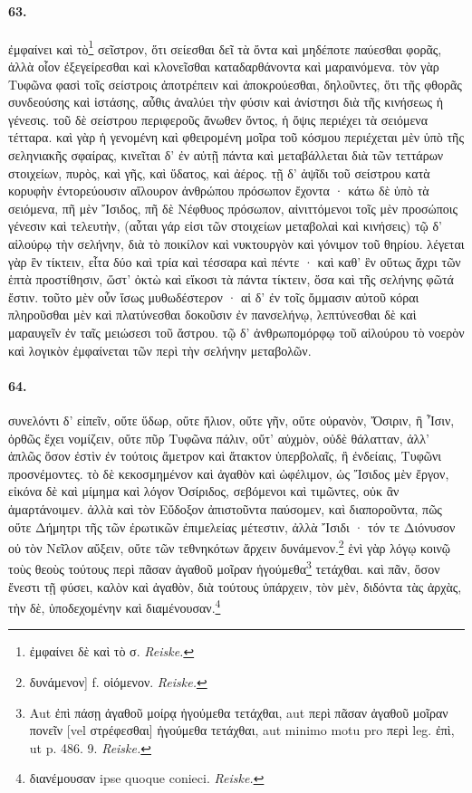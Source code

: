 \documentclass[a4paper, 11pt, oneside, polutonikogreek, german, landscape]{article}
\begin{document}
\paragraph{63.}
ἐμφαίνει καὶ τὸ\footnote{ἐμφαίνει δὲ καὶ τὸ σ. \emph{Reiske.}} σεῖστρον, ὅτι σείεσθαι δεῖ τὰ ὄντα καὶ μηδέποτε παύεσθαι φορᾶς, ἀλλὰ οἷον ἐξεγείρεσθαι καὶ κλονεῖσθαι καταδαρθάνοντα καὶ μαραινόμενα. τὸν γὰρ Τυφῶνα φασὶ τοῖς σείστροις ἀποτρέπειν καὶ ἀποκρούεσθαι, δηλοῦντες, ὅτι τῆς φθορᾶς συνδεούσης καὶ ἱστάσης, αὖθις ἀναλύει τὴν φύσιν καὶ ἀνίστησι διὰ τῆς κινήσεως ἡ γένεσις. τοῦ δὲ σείστρου περιφεροῦς ἄνωθεν ὄντος, ἡ ὄψις περιέχει τὰ σειόμενα τέτταρα. καὶ γὰρ ἡ γενομένη καὶ φθειρομένη μοῖρα τοῦ κόσμου περιέχεται μὲν ὑπὸ τῆς σεληνιακῆς σφαίρας, κινεῖται δ' ἐν αὐτῇ πάντα καὶ μεταβάλλεται διὰ τῶν τεττάρων στοιχείων, πυρὸς, καὶ γῆς, καὶ ὕδατος, καὶ ἀέρος. τῇ δ' ἀψῖδι τοῦ σείστρου κατὰ κορυφὴν ἐντορεύουσιν αἴλουρον ἀνθρώπου πρόσωπον ἔχοντα · κάτω δὲ ὑπὸ τὰ σειόμενα, πῆ μὲν Ἴσιδος, πῆ δὲ Νέφθυος πρόσωπον, αἰνιττόμενοι τοῖς μὲν προσώποις γένεσιν καὶ τελευτὴν, (αὗται γάρ εἰσι τῶν στοιχείων μεταβολαὶ καὶ κινήσεις) τῷ δ' αἰλούρῳ τὴν σελήνην, διὰ τὸ ποικίλον καὶ νυκτουργὸν καὶ γόνιμον τοῦ θηρίου. λέγεται γὰρ ἓν τίκτειν, εἶτα δύο καὶ τρία καὶ τέσσαρα καὶ πέντε · καὶ καθ' ἓν οὕτως ἄχρι τῶν ἑπτὰ προστίθησιν, ὥστ' ὀκτὼ καὶ εἴκοσι τὰ πάντα τίκτειν, ὅσα καὶ τῆς σελήνης φῶτά ἔστιν. τοῦτο μὲν οὖν ἴσως μυθωδέστερον · αἱ δ' ἐν τοῖς ὄμμασιν αὐτοῦ κόραι πληροῦσθαι μὲν καὶ πλατύνεσθαι δοκοῦσιν ἐν πανσελήνῳ, λεπτύνεσθαι δὲ καὶ μαραυγεῖν ἐν ταῖς μειώσεσι τοῦ ἄστρου. τῷ δ' ἀνθρωπομόρφῳ τοῦ αἰλούρου τὸ νοερὸν καὶ λογικὸν ἐμφαίνεται τῶν περὶ τὴν σελήνην μεταβολῶν.

\paragraph{64.}
συνελόντι δ' εἰπεῖν, οὔτε ὕδωρ, οὔτε ἥλιον, οὔτε γῆν, οὔτε οὐρανὸν, Ὄσιριν, ἢ Ἶσιν, ὀρθῶς ἔχει νομίζειν, οὔτε πῦρ Τυφῶνα πάλιν, οὔτ' αὐχμὸν, οὐδὲ θάλατταν, ἀλλ' ἁπλῶς ὅσον ἐστὶν ἐν τούτοις ἄμετρον καὶ ἄτακτον ὑπερβολαῖς, ἢ ἐνδείαις, Τυφῶνι προσνέμοντες. τὸ δὲ κεκοσμημένον καὶ ἀγαθὸν καὶ ὠφέλιμον, ὡς Ἴσιδος μὲν ἔργον, εἰκόνα δὲ καὶ μίμημα καὶ λόγον Ὀσίριδος, σεβόμενοι καὶ τιμῶντες, οὐκ ἂν ἁμαρτάνοιμεν. ἀλλὰ καὶ τὸν Εὔδοξον ἀπιστοῦντα παύσομεν, καὶ διαποροῦντα, πῶς οὔτε Δήμητρι τῆς τῶν ἐρωτικῶν ἐπιμελείας μέτεστιν, ἀλλὰ Ἴσιδι · τόν τε Διόνυσον οὐ τὸν Νεῖλον αὔξειν, οὔτε τῶν τεθνηκότων ἄρχειν δυνάμενον.\footnote{δυνάμενον] f. οἰόμενον. \emph{Reiske.}} ἑνὶ γὰρ λόγῳ κοινῷ τοὺς θεοὺς τούτους περὶ πᾶσαν ἀγαθοῦ μοῖραν ἡγούμεθα\footnote{Aut ἐπὶ πάσῃ ἀγαθοῦ μοίρᾳ ἡγούμεθα τετάχθαι, aut περὶ πᾶσαν ἀγαθοῦ μοῖραν πονεῖν [vel στρέφεσθαι] ἡγούμεθα τετάχθαι, aut minimo motu pro περὶ leg. ἐπὶ, ut p. 486. 9. \emph{Reiske.}} τετάχθαι. καὶ πᾶν, ὅσον ἔνεστι τῇ φύσει, καλὸν καὶ ἀγαθὸν, διὰ τούτους ὑπάρχειν, τὸν μὲν, διδόντα τὰς ἀρχὰς, τὴν δὲ, ὑποδεχομένην καὶ διαμένουσαν.\footnote{διανέμουσαν ipse quoque conieci. \emph{Reiske.}}
\end{document}
